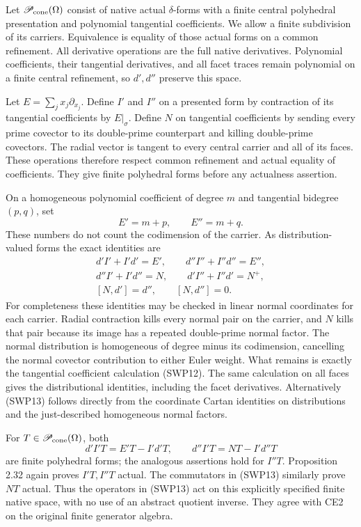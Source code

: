 Let $\mathscr P_{\rm cone}(\Omega)$ consist of native actual
$\delta$-forms with a finite central polyhedral presentation and
polynomial tangential coefficients.  We allow a finite subdivision
of its carriers.  Equivalence is equality of those actual forms on
a common refinement.  All derivative operations are the full native
derivatives.  Polynomial coefficients, their tangential derivatives,
and all facet traces remain polynomial on a finite central
refinement, so $d',d''$ preserve this space.

Let $E=\sum_jx_j\partial_{x_j}$.  Define $I'$ and $I''$
on a presented form by contraction of its tangential coefficients
by $E|_\sigma$.  Define $N$ on tangential coefficients by sending
every prime covector to its double-prime counterpart and killing
double-prime covectors.  The radial vector is tangent to every
central carrier and all of its faces.  These operations therefore
respect common refinement and actual equality of coefficients.
They give finite polyhedral forms before any actualness assertion.

On a homogeneous polynomial coefficient of degree $m$ and
tangential bidegree $(p,q)$, set
\[
                         E'=m+p,\qquad E''=m+q.
 \tag{SWP12}
\]
These numbers do not count the codimension of the carrier.  As
distribution-valued forms the exact identities are
\[
 \begin{gathered}
 d'I'+I'd'=E',\qquad d''I''+I''d''=E'',\\
 d''I'+I'd''=N,\qquad d'I''+I''d'=N^+,\\
 [N,d']=d'',\qquad [N,d'']=0.
 \end{gathered}
 \tag{SWP13}
\]
For completeness these identities may be checked in linear normal
coordinates for each carrier.  Radial contraction kills every normal
pair on the carrier, and $N$ kills that pair because its image has a
repeated double-prime normal factor.  The normal distribution is
homogeneous of degree minus its codimension, cancelling the normal
covector contribution to either Euler weight.  What remains is
exactly the tangential coefficient calculation (SWP12).  The same
calculation on all faces gives the distributional identities,
including the facet derivatives.  Alternatively (SWP13) follows
directly from the coordinate Cartan identities on distributions
and the just-described homogeneous normal factors.

For $T\in\mathscr P_{\rm cone}(\Omega)$, both
\[
 d'I'T=E'T-I'd'T,\qquad d''I'T=NT-I'd''T
 \tag{SWP14}
\]
are finite polyhedral forms; the analogous assertions hold for
$I''T$.  Proposition 2.32 again proves $I'T,I''T$ actual.
The commutators in (SWP13) similarly prove $NT$ actual.  Thus the
operators in (SWP13) act on this explicitly specified finite native
space, with no use of an abstract quotient inverse.  They agree
with CE2 on the original finite generator algebra.


